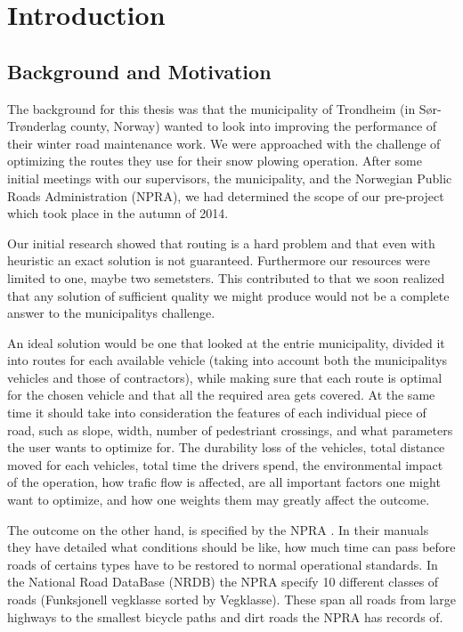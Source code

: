 \chapter{Introduction}

\section{Background and Motivation}

The background for this thesis was that the municipality of Trondheim (in Sør-Trønderlag county, Norway) wanted to look into improving the performance of their winter road maintenance work. We were approached with the challenge of optimizing the routes they use for their snow plowing operation. After some initial meetings with our supervisors, the municipality, and the Norwegian Public Roads Administration (NPRA), we had determined the scope of our pre-project which took place in the autumn of 2014.

Our initial research showed that routing is a hard problem and that even with heuristic an exact solution is not guaranteed. Furthermore our resources were limited to one, maybe two semetsters. This contributed to that we soon realized that any solution of sufficient quality we might produce would not be a complete answer to the municipalitys challenge.

An ideal solution would be one that looked at the entrie municipality, divided it into routes for each available vehicle (taking into account both the municipalitys vehicles and those of contractors), while making sure that each route is optimal for the chosen vehicle and that all the required area gets covered. At the same time it should take into consideration the features of each individual piece of road, such as slope, width, number of pedestriant crossings, and what parameters the user wants to optimize for. The durability loss of the vehicles, total distance moved for each vehicles, total time the drivers spend, the environmental impact of the operation, how trafic flow is affected, are all important factors one might want to optimize, and how one weights them may greatly affect the outcome.

The outcome on the other hand, is specified by the NPRA
. In their manuals they have detailed what conditions should be like, how much time can pass before roads of certains types have to be restored to normal operational standards. In the National Road DataBase (NRDB) 
the NPRA specify 10 different classes of roads (Funksjonell vegklasse sorted by Vegklasse). These span all roads from large highways to the smallest bicycle paths and dirt roads the NPRA has records of.

